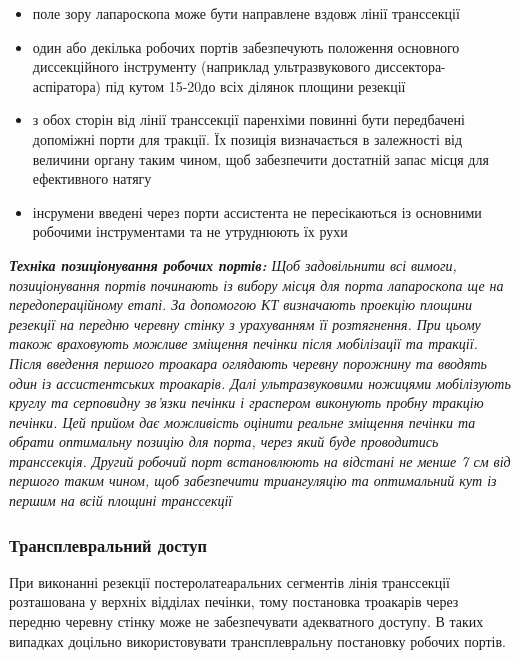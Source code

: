 \begin{refsection}
\begin{itemize}
    \item поле зору лапароскопа може бути направлене вздовж лінії транссекції
    \item один або декілька робочих портів забезпечують положення основного диссекційного інструменту (наприклад ультразвукового диссектора-аспіратора) під кутом 15-20\degree до всіх ділянок площини резекції
    \item з обох сторін від лінії транссекції паренхіми повинні бути передбачені допоміжні порти для тракції. Їх позиція визначається в залежності від величини органу таким чином, щоб забезпечити достатній запас місця для ефективного натягу
    \item інсрумени введені через порти ассистента не пересікаються із основними робочими інструментами та не утруднюють їх рухи
\end{itemize}

\textit{ \textbf{Техніка позиціонування робочих портів:} Щоб задовільнити всі вимоги, позиціонування портів починають із вибору місця для порта лапароскопа ще на передопераційному етапі. За допомогою КТ визначають проекцію площини резекції на передню черевну стінку з урахуванням її розтягнення. При цьому також враховують можливе зміщення печінки після мобілізації та тракції. Після введення першого троакара оглядають черевну порожнину та вводять один із ассистентських троакарів. Далі ультразвуковими ножицями мобілізують круглу та серповидну зв'язки печінки і граспером виконують пробну тракцію печінки. Цей прийом дає можливість оцінити реальне зміщення печінки та обрати оптимальну позицію для порта, через який буде проводитись транссекція. Другий робочий порт встановлюють на відстані не менше 7 см від першого таким чином, щоб забезпечити триангуляцію та оптимальний кут із першим на всій площині транссекції }
 

\subsubsection{Трансплевральний доступ}

При виконанні резекції постеролатеаральних сегментів лінія транссекції розташована у верхніх відділах печінки, тому постановка троакарів через передню черевну стінку може не забезпечувати адекватного доступу. В таких випадках доцільно використовувати трансплевральну постановку робочих портів. 


\end{refsection}
